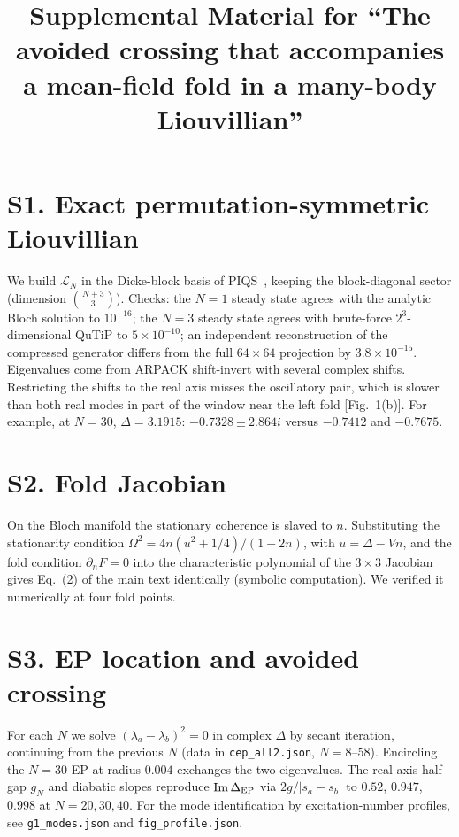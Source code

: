 \documentclass[aps,prl,onecolumn,superscriptaddress,amsmath,amssymb]{revtex4-2}
\newcommand{\Lc}{\mathcal{L}}
\begin{document}
\title{Supplemental Material for ``The avoided crossing that accompanies a mean-field fold in a many-body Liouvillian''}
\maketitle

\section{S1. Exact permutation-symmetric Liouvillian}
We build $\Lc_N$ in the Dicke-block basis of PIQS~\cite{Shammah2018}, keeping the block-diagonal sector (dimension $\binom{N+3}{3}$). Checks: the $N=1$ steady state agrees with the analytic Bloch solution to $10^{-16}$; the $N=3$ steady state agrees with brute-force $2^3$-dimensional QuTiP to $5\times10^{-10}$; an independent reconstruction of the compressed generator differs from the full $64\times64$ projection by $3.8\times10^{-15}$. Eigenvalues come from ARPACK shift-invert with several complex shifts. Restricting the shifts to the real axis misses the oscillatory pair, which is slower than both real modes in part of the window near the left fold [Fig.~1(b)]. For example, at $N=30$, $\Delta=3.1915$: $-0.7328\pm2.864i$ versus $-0.7412$ and $-0.7675$.

\section{S2. Fold Jacobian}
On the Bloch manifold the stationary coherence is slaved to $n$. Substituting the stationarity condition $\Omega^2=4n(u^2+1/4)/(1-2n)$, with $u=\Delta-Vn$, and the fold condition $\partial_nF=0$ into the characteristic polynomial of the $3\times3$ Jacobian gives Eq.~(2) of the main text identically (symbolic computation). We verified it numerically at four fold points.

\section{S3. EP location and avoided crossing}
For each $N$ we solve $(\lambda_a-\lambda_b)^2=0$ in complex $\Delta$ by secant iteration, continuing from the previous $N$ (data in \texttt{cep\_all2.json}, $N=8$--$58$). Encircling the $N=30$ EP at radius $0.004$ exchanges the two eigenvalues. The real-axis half-gap $g_N$ and diabatic slopes reproduce ${\rm Im}\,\Delta_{\rm EP}$ via $2g/|s_a-s_b|$ to $0.52$, $0.947$, $0.998$ at $N=20,30,40$. For the mode identification by excitation-number profiles, see \texttt{g1\_modes.json} and \texttt{fig\_profile.json}.
\end{document}
